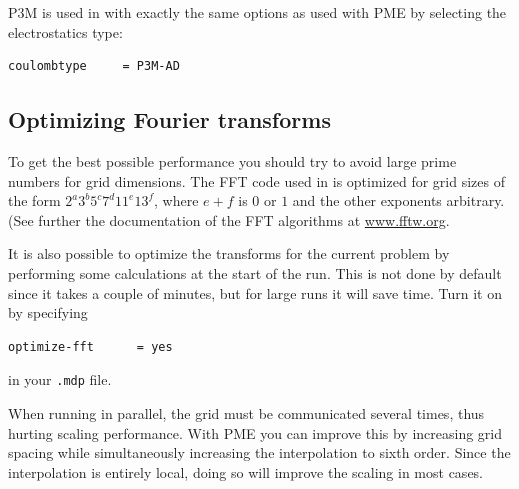 P3M is used in {\gromacs} with exactly the same options as used with PME
by selecting the electrostatics type:
\begin{verbatim}
coulombtype     = P3M-AD
\end{verbatim}

\subsection{Optimizing Fourier transforms}
To get the best possible performance you should try to avoid large
prime numbers for grid dimensions.
The FFT code used in {\gromacs} is
optimized for grid sizes of the form $2^a 3^b 5^c 7^d 11^e 13^f$,
where $e+f$ is $0$ or $1$ and the other exponents arbitrary. (See
further the documentation of the FFT algorithms at
\href{http://www.fftw.org}{www.fftw.org}.

It is also possible to optimize the transforms for the current problem
by performing some calculations at the start of the run. This is not
done by default since it takes a couple of minutes, but for large
runs it will save time. Turn it on by specifying

\begin{verbatim}
optimize-fft      = yes
\end{verbatim}
in your {\tt .mdp} file.

When running in parallel, the grid must be communicated several times,
thus hurting scaling performance. With PME you can improve this
by increasing grid spacing while simultaneously increasing the
interpolation to {\eg} sixth order.
Since the interpolation is entirely local, doing so will
improve the scaling in most cases.

%
%
%


